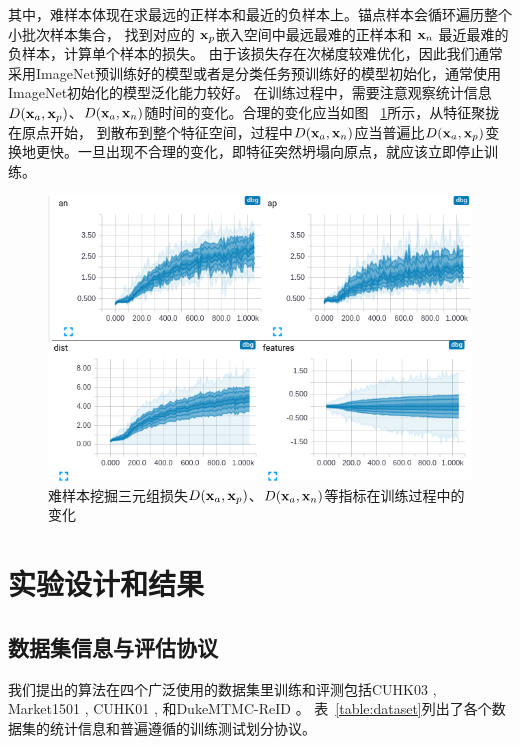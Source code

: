 其中，难样本体现在求最远的正样本和最近的负样本上。锚点样本会循环遍历整个小批次样本集合，
找到对应的 ${\mathbf{x}}_p$嵌入空间中最远最难的正样本和 ${\mathbf{x}}_n$ 最近最难的负样本，计算单个样本的损失。
由于该损失存在次梯度较难优化，因此我们通常采用ImageNet预训练好的模型或者是分类任务预训练好的模型初始化，通常使用ImageNet初始化的模型泛化能力较好。
在训练过程中，需要注意观察统计信息$D({\mathbf{x}}_a,{\mathbf{x}}_p)$、$D({\mathbf{x}}_a,{\mathbf{x}}_n)$随时间的变化。合理的变化应当如图 ~\ref{fig:triok}所示，从特征聚拢在原点开始，
到散布到整个特征空间，过程中$D({\mathbf{x}}_a,{\mathbf{x}}_n)$应当普遍比$D({\mathbf{x}}_a,{\mathbf{x}}_p)$变换地更快。一旦出现不合理的变化，即特征突然坍塌向原点，就应该立即停止训练。

\begin{figure}
	\centering 
	\includegraphics[width=.9\textwidth]{fig/2018-05-19-23-10-33.png}
	\caption{难样本挖掘三元组损失$D({\mathbf{x}}_a,{\mathbf{x}}_p)$、$D({\mathbf{x}}_a,{\mathbf{x}}_n)$等指标在训练过程中的变化} \label{fig:triok}
\end{figure}

\section{实验设计和结果}

\subsection{数据集信息与评估协议}

我们提出的算法在四个广泛使用的数据集里训练和评测包括CUHK03 \cite{li2014deepreid}, 
Market1501 \cite{zheng2015scalable},  CUHK01 \cite{li2013locally}, 
和DukeMTMC-ReID \cite{zheng2017unlabeled} \cite{ristani2016MTMC} 。
表~\ref{table:dataset}列出了各个数据集的统计信息和普遍遵循的训练测试划分协议。

